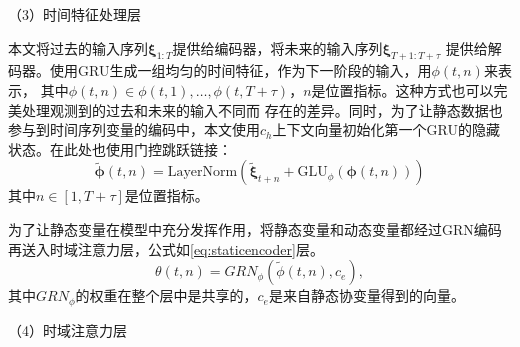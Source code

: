 （3）时间特征处理层

本文将过去的输入序列$\bm{\xi}_{1:T}$提供给编码器，将未来的输入序列$\bm{\xi}_{T+1:T+\tau}$
提供给解码器。使用GRU生成一组均匀的时间特征，作为下一阶段的输入，用$\phi (t,n)$来表示，
其中$\phi(t,n) \in {\phi(t, 1), \ldots, \phi(t, T+\tau)}$，$n$是位置指标。这种方式也可以完美处理观测到的过去和未来的输入不同而
存在的差异。同时，为了让静态数据也参与到时间序列变量的编码中，本文使用${c_h}$上下文向量初始化第一个GRU的隐藏状态。在此处也使用门控跳跃链接：
\begin{equation}
    \tilde{\bm{\phi}}(t, n) = \text{LayerNorm}\left(\tilde{\bm{\xi}}_{t+n} + \text{GLU}_{\phi}(\bm{\phi}(t, n))\right)
\end{equation}
其中$n \in [1, T+\tau]$是位置指标。

为了让静态变量在模型中充分发挥作用，将静态变量和动态变量都经过GRN编码再送入时域注意力层，公式如\eqref{eq:staticencoder}层。
\begin{equation}
    \theta(t, n) = GRN_{\phi}(\tilde{\phi}(t, n), c_e),
    \label{eq:staticencoder}
\end{equation}
其中$GRN_{\phi}$的权重在整个层中是共享的，${c}_e$是来自静态协变量得到的向量。

（4）时域注意力层

